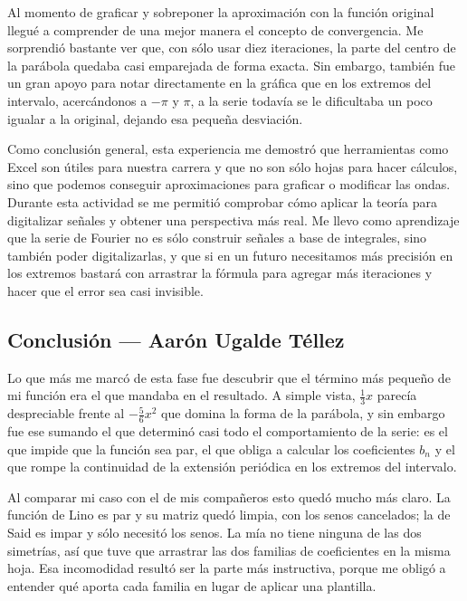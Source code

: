 Al momento de graficar y sobreponer la aproximación con la función original llegué a comprender de una mejor manera el concepto de convergencia. Me sorprendió bastante ver que, con sólo usar diez iteraciones, la parte del centro de la parábola quedaba casi emparejada de forma exacta. Sin embargo, también fue un gran apoyo para notar directamente en la gráfica que en los extremos del intervalo, acercándonos a $-\pi$ y $\pi$, a la serie todavía se le dificultaba un poco igualar a la original, dejando esa pequeña desviación.

Como conclusión general, esta experiencia me demostró que herramientas como Excel son útiles para nuestra carrera y que no son sólo hojas para hacer cálculos, sino que podemos conseguir aproximaciones para graficar o modificar las ondas. Durante esta actividad se me permitió comprobar cómo aplicar la teoría para digitalizar señales y obtener una perspectiva más real. Me llevo como aprendizaje que la serie de Fourier no es sólo construir señales a base de integrales, sino también poder digitalizarlas, y que si en un futuro necesitamos más precisión en los extremos bastará con arrastrar la fórmula para agregar más iteraciones y hacer que el error sea casi invisible.

\subsection{Conclusión — Aarón Ugalde Téllez}
\label{sec:cap02:concl:aaron}


Lo que más me marcó de esta fase fue descubrir que el término más pequeño de mi función era el que mandaba en el resultado. A simple vista, $\frac{1}{3}x$ parecía despreciable frente al $-\frac{5}{6}x^{2}$ que domina la forma de la parábola, y sin embargo fue ese sumando el que determinó casi todo el comportamiento de la serie: es el que impide que la función sea par, el que obliga a calcular los coeficientes $b_n$ y el que rompe la continuidad de la extensión periódica en los extremos del intervalo.

Al comparar mi caso con el de mis compañeros esto quedó mucho más claro. La función de Lino es par y su matriz quedó limpia, con los senos cancelados; la de Said es impar y sólo necesitó los senos. La mía no tiene ninguna de las dos simetrías, así que tuve que arrastrar las dos familias de coeficientes en la misma hoja. Esa incomodidad resultó ser la parte más instructiva, porque me obligó a entender qué aporta cada familia en lugar de aplicar una plantilla.

